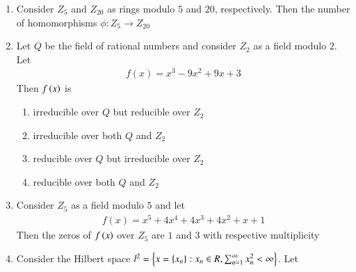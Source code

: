 \documentclass[journal]{IEEEtran}
\begin{document}
\begin{enumerate}
	\item Consider $Z_5$ and $Z_{20}$ as rings modulo $5$ and $20 $, respectively. Then the number of homomorphisms $\phi : Z_5 \rightarrow  Z_{20}$ 
		\begin{enumerate}
        	\end{enumerate}	
	\item Let $Q$ be the field of rational numbers and consider $Z_{2}$ as a field modulo $2$. Let
             \begin{align*}
		f(x)=x^{3}-9 x^{2}+9 x+3
             \end{align*}
		Then $f\left(x\right)$ is
		\begin{enumerate}
			\item irreducible over $Q$ but reducible over $Z_{2}$
            \item irreducible over both $Q$ and $Z_{2}$
            \item reducible over $Q$ but irreducible over $Z_{2}$
            \item reducible over both $Q$ and $Z_{2}$
        	\end{enumerate}	
	\item  Consider $Z_{5}$ as a field modulo $5$ and let
           \begin{align*}
		f(x)=x^{5}+4 x^{4}+4 x^{3}+4 x^{2}+x+1
             \end{align*}
	     Then the zeros of $f\left(x\right)$ over $Z_{5}$ are $1$ and $3$ with respective multiplicity
		\begin{enumerate}
        	\end{enumerate}	
	\item Consider the Hilbert space $l^{2}=\left\{x=\left\{x_{n}\right\}: x_{n} \in R, \sum_{n=1}^{\infty} x_{n}^{2}<\infty\right\}$. Let
             \begin{align*}

\end{align*}
\end{enumerate}
\end{document}
